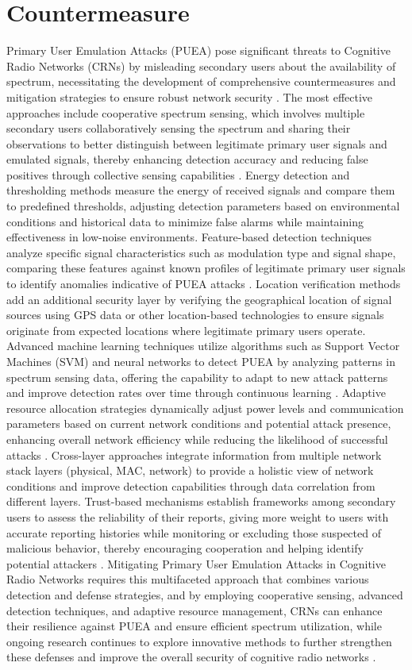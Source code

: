 \section{\textbf{Countermeasure}}
Primary User Emulation Attacks (PUEA) pose significant threats to Cognitive Radio Networks (CRNs) by misleading secondary users about the availability of spectrum, necessitating the development of comprehensive countermeasures and mitigation strategies to ensure robust network security \cite{ref1,ref4,ref24}. The most effective approaches include cooperative spectrum sensing, which involves multiple secondary users collaboratively sensing the spectrum and sharing their observations to better distinguish between legitimate primary user signals and emulated signals, thereby enhancing detection accuracy and reducing false positives through collective sensing capabilities \cite{ref8}. Energy detection and thresholding methods measure the energy of received signals and compare them to predefined thresholds, adjusting detection parameters based on environmental conditions and historical data to minimize false alarms while maintaining effectiveness in low-noise environments. Feature-based detection techniques analyze specific signal characteristics such as modulation type and signal shape, comparing these features against known profiles of legitimate primary user signals to identify anomalies indicative of PUEA attacks \cite{ref11}. Location verification methods add an additional security layer by verifying the geographical location of signal sources using GPS data or other location-based technologies to ensure signals originate from expected locations where legitimate primary users operate. Advanced machine learning techniques utilize algorithms such as Support Vector Machines (SVM) and neural networks to detect PUEA by analyzing patterns in spectrum sensing data, offering the capability to adapt to new attack patterns and improve detection rates over time through continuous learning \cite{ref9,ref19,ref23}. Adaptive resource allocation strategies dynamically adjust power levels and communication parameters based on current network conditions and potential attack presence, enhancing overall network efficiency while reducing the likelihood of successful attacks \cite{ref3}. Cross-layer approaches integrate information from multiple network stack layers (physical, MAC, network) to provide a holistic view of network conditions and improve detection capabilities through data correlation from different layers. Trust-based mechanisms establish frameworks among secondary users to assess the reliability of their reports, giving more weight to users with accurate reporting histories while monitoring or excluding those suspected of malicious behavior, thereby encouraging cooperation and helping identify potential attackers \cite{ref5,ref8}. Mitigating Primary User Emulation Attacks in Cognitive Radio Networks requires this multifaceted approach that combines various detection and defense strategies, and by employing cooperative sensing, advanced detection techniques, and adaptive resource management, CRNs can enhance their resilience against PUEA and ensure efficient spectrum utilization, while ongoing research continues to explore innovative methods to further strengthen these defenses and improve the overall security of cognitive radio networks \cite{ref3,ref8,ref24,ref25}.